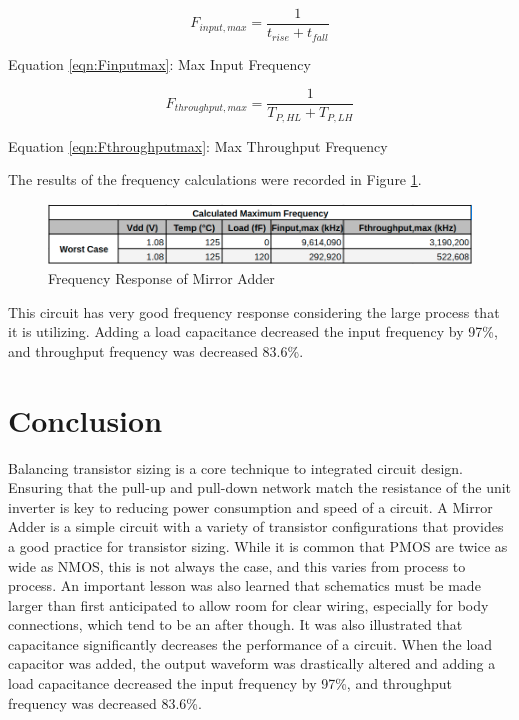 \documentclass[11pt]{article}
\begin{document}
		\begin{equation}\label{eqn:Finputmax}
			F_{input,max} = \frac{1}{t_{rise}+t_{fall}}
		\end{equation}
		\begin{center}
			Equation \ref{eqn:Finputmax}: Max Input Frequency
		\end{center}
		
		\begin{equation}\label{eqn:Fthroughputmax}
			F_{throughput,max} = \frac{1}{T_{P,HL}+T_{P,LH}}
		\end{equation}
		\begin{center}
			Equation \ref{eqn:Fthroughputmax}: Max Throughput Frequency
		\end{center}

		The results of the frequency calculations were recorded in Figure \ref{fig:frequency-results}.
		
		\begin{figure}[H]
			\centering
			\includegraphics[width=0.7\linewidth]{"Pictures/Frequency Results"}
			\caption{Frequency Response of Mirror Adder}
			\label{fig:frequency-results}
		\end{figure}
		
		This circuit has very good frequency response considering the large process that it is utilizing. Adding a load capacitance decreased the input frequency by 97\%, and throughput frequency was decreased 83.6\%.

\clearpage
\vfill
\section{Conclusion}
 	Balancing transistor sizing is a core technique to integrated circuit design. Ensuring that the pull-up and pull-down network match the resistance of the unit inverter is key to reducing power consumption and speed of a circuit. A Mirror Adder is a simple circuit with a variety of transistor configurations that provides a good practice for transistor sizing. While it is common that PMOS are twice as wide as NMOS, this is not always the case, and this varies from process to process. An important lesson was also learned that schematics must be made larger than first anticipated to allow room for clear wiring, especially for body connections, which tend to be an after though. It was also illustrated that capacitance significantly decreases the performance of a circuit. When the load capacitor was added, the output waveform was drastically altered and adding a load capacitance decreased the input frequency by 97\%, and throughput frequency was decreased 83.6\%.
\end{document}
